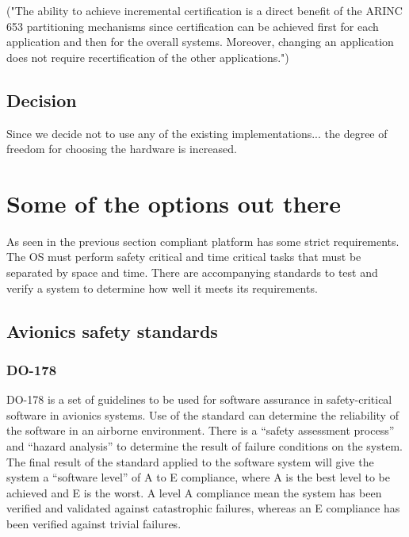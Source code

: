 ("The ability to achieve incremental certification is a direct benefit of the ARINC 653 partitioning mechanisms since certification can be achieved first for each application and then for the overall systems. Moreover, changing an application does not require recertification of the other applications.")

\subsection{Decision}
Since we decide not to use any of the existing implementations...
the degree of freedom for choosing the hardware is increased.

\iffalse
\section{Some of the options out there}
As seen in the previous section \arinc{} compliant platform has some strict requirements.
The OS must perform safety critical and time critical tasks that must be separated by space and time.
There are accompanying standards to test and verify a system to determine how well it meets its requirements.

\subsection{Avionics safety standards}

\subsubsection{DO-178}
DO-178 is a set of guidelines to be used for software assurance in safety-critical software in avionics systems.
Use of the standard can determine the reliability of the software in an airborne environment.
There is a ``safety assessment process'' and ``hazard analysis'' to determine the result of failure conditions on the system.
The final result of the standard applied to the software system will give the system a ``software level'' of A to E compliance,
where A is the best level to be achieved and E is the worst.
A level A compliance mean the system has been verified and validated against catastrophic failures,
whereas an E compliance has been verified against trivial failures.

